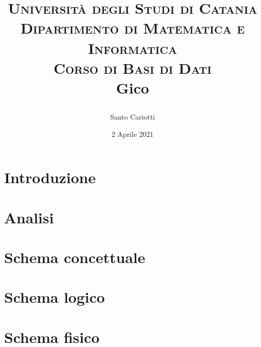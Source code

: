 

\title{
    \small\textsc{Università degli Studi di Catania\\Dipartimento di Matematica e Informatica\\Corso di Basi di Dati}\\
    \Huge\textbf{Gico}\\
    \author{Santo Cariotti}
    \date{2 Aprile 2021}
}

\usepackage{graphicx}

\maketitle

\renewcommand{\contentsname}{Indice}
\tableofcontents{}


\chapter{Introduzione}


\chapter{Analisi}


\chapter{Schema concettuale}


\chapter{Schema logico}


\chapter{Schema fisico}



